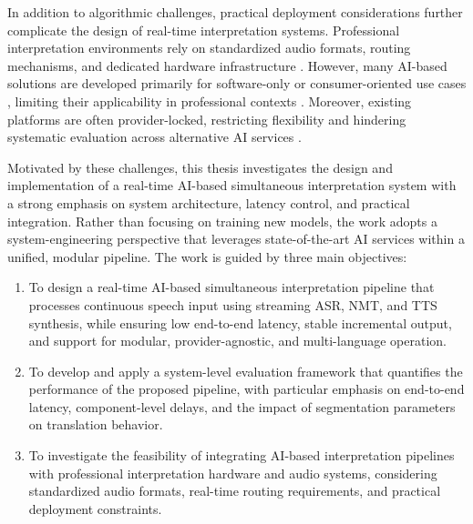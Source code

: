 In addition to algorithmic challenges, practical deployment considerations further complicate the design of real-time interpretation systems. Professional interpretation environments rely on standardized audio formats, routing mechanisms, and dedicated hardware infrastructure \cite{conference_interpreting_new_tech}. However, many AI-based solutions are developed primarily for software-only or consumer-oriented use cases \cite{dhawan2022speech2speechchallenges} , limiting their applicability in professional contexts \cite{ozkaya2023transformative}. Moreover, existing platforms are often provider-locked, restricting flexibility and hindering systematic evaluation across alternative AI services \cite{sperber2020endtoendpromise}.

Motivated by these challenges, this thesis investigates the design and implementation of a real-time AI-based simultaneous interpretation system with a strong emphasis on system architecture, latency control, and practical integration. Rather than focusing on training new models, the work adopts a system-engineering perspective that leverages state-of-the-art AI services within a unified, modular pipeline.  The work is guided by three main objectives:
\begin{enumerate}
  \item To design a real-time AI-based simultaneous interpretation pipeline that processes continuous speech input using streaming ASR, NMT, and TTS synthesis, while ensuring low end-to-end latency, stable incremental output, and support for modular, provider-agnostic, and multi-language operation.
  
  \item To develop and apply a system-level evaluation framework that quantifies the performance of the proposed pipeline, with particular emphasis on end-to-end latency, component-level delays, and the impact of segmentation parameters on translation behavior.
  
  \item To investigate the feasibility of integrating AI-based interpretation pipelines with professional interpretation hardware and audio systems, considering standardized audio formats, real-time routing requirements, and practical deployment constraints.
\end{enumerate}

